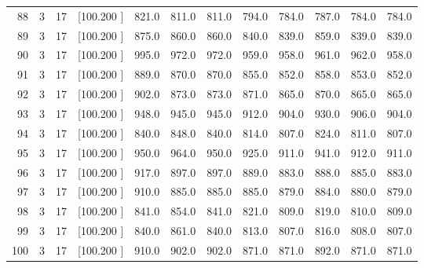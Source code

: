 \documentclass[12pt,a4paper]{article}
\begin{document}
\begin{center}
{\begin{tabular}{r r r r r r r r r r r r}
  88&  3& 17&[100.200   ]&   821.0&   811.0&   811.0&   794.0&   784.0&   787.0&   784.0&   784.0\\[-0.02in]
  89&  3& 17&[100.200   ]&   875.0&   860.0&   860.0&   840.0&   839.0&   859.0&   839.0&   839.0\\[-0.02in]
  90&  3& 17&[100.200   ]&   995.0&   972.0&   972.0&   959.0&   958.0&   961.0&   962.0&   958.0\\[-0.02in]
  91&  3& 17&[100.200   ]&   889.0&   870.0&   870.0&   855.0&   852.0&   858.0&   853.0&   852.0\\[-0.02in]
  92&  3& 17&[100.200   ]&   902.0&   873.0&   873.0&   871.0&   865.0&   870.0&   865.0&   865.0\\[-0.02in]
  93&  3& 17&[100.200   ]&   948.0&   945.0&   945.0&   912.0&   904.0&   930.0&   906.0&   904.0\\[-0.02in]
  94&  3& 17&[100.200   ]&   840.0&   848.0&   840.0&   814.0&   807.0&   824.0&   811.0&   807.0\\[-0.02in]
  95&  3& 17&[100.200   ]&   950.0&   964.0&   950.0&   925.0&   911.0&   941.0&   912.0&   911.0\\[-0.02in]
  96&  3& 17&[100.200   ]&   917.0&   897.0&   897.0&   889.0&   883.0&   888.0&   885.0&   883.0\\[-0.02in]
  97&  3& 17&[100.200   ]&   910.0&   885.0&   885.0&   885.0&   879.0&   884.0&   880.0&   879.0\\[-0.02in]
  98&  3& 17&[100.200   ]&   841.0&   854.0&   841.0&   821.0&   809.0&   819.0&   810.0&   809.0\\[-0.02in]
  99&  3& 17&[100.200   ]&   840.0&   861.0&   840.0&   813.0&   807.0&   816.0&   808.0&   807.0\\[-0.02in]
 100&  3& 17&[100.200   ]&   910.0&   902.0&   902.0&   871.0&   871.0&   892.0&   871.0&   871.0\\[-0.02in]

\hline
\end{tabular}}
\end{center}
\end{document}
